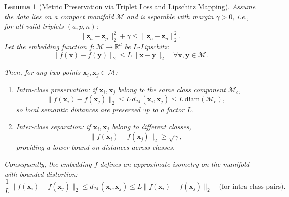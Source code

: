 \documentclass[a4paper,12pt,reqno]{amsart}
\newtheorem{lemma}[theorem]{\textbf{Lemma} }
\theoremstyle{definition}
\theoremstyle{remark}
\begin{document}
\begin{lemma}[Metric Preservation via Triplet Loss and Lipschitz Mapping]
		\label{lemma:metric}
		Assume the data lies on a compact manifold $\mathcal{M}$ and is separable with margin $\gamma > 0$, i.e., for all valid triplets $(a,p,n)$:
		\[
		\|\mathbf{z}_a - \mathbf{z}_p\|_2^2 + \gamma \leq \|\mathbf{z}_a - \mathbf{z}_n\|_2^2.
		\]
		Let the embedding function $f:\mathcal{M} \to \mathbb{R}^d$ be $L$-Lipschitz:
		\[
		\|f(\mathbf{x}) - f(\mathbf{y})\|_2 \le L \|\mathbf{x} - \mathbf{y}\|_2 \quad \forall \mathbf{x}, \mathbf{y} \in \mathcal{M}.
		\]
		
		Then, for any two points $\mathbf{x}_i, \mathbf{x}_j \in \mathcal{M}$:
		
		\begin{enumerate}[label=(\roman*)]
			\item {Intra-class preservation:} if $\mathbf{x}_i, \mathbf{x}_j$ belong to the same class component $\mathcal{M}_c$,
			\[
			\|f(\mathbf{x}_i) - f(\mathbf{x}_j)\|_2 \le L \, d_{\mathcal{M}}(\mathbf{x}_i, \mathbf{x}_j) \le L \, \text{diam}(\mathcal{M}_c),
			\]
			so local semantic distances are preserved up to a factor $L$.
			
			\item {Inter-class separation:} if $\mathbf{x}_i, \mathbf{x}_j$ belong to different classes,
			\[
			\|f(\mathbf{x}_i) - f(\mathbf{x}_j)\|_2 \ge \sqrt{\gamma},
			\]
			providing a lower bound on distances across classes.
		\end{enumerate}
		
		Consequently, the embedding $f$ defines an \emph{approximate isometry} on the manifold with bounded distortion:
		\[
		\frac{1}{L} \|f(\mathbf{x}_i) - f(\mathbf{x}_j)\|_2 \le d_{\mathcal{M}}(\mathbf{x}_i, \mathbf{x}_j) \le L \|f(\mathbf{x}_i) - f(\mathbf{x}_j)\|_2 \quad \text{(for intra-class pairs)}.
		\]
		
	\end{lemma}
	
\end{document}

